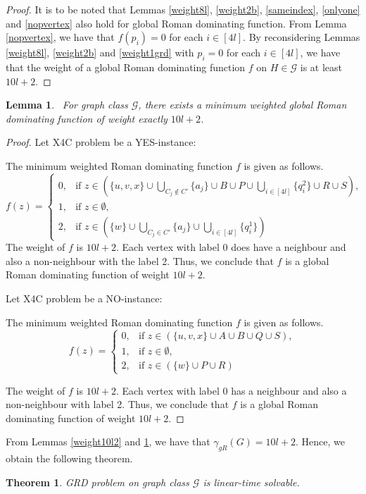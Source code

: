 \documentclass[preprint,12pt]{elsarticle}
\newtheorem{theorem}{Theorem}[section]
\newtheorem{lemma}{Lemma}
\begin{document}
\begin{proof}
    It is to be noted that Lemmas \ref{weight8l}, \ref{weight2b}, \ref{sameindex}, \ref{onlyone} and \ref{nopvertex} also hold for global Roman dominating function. From Lemma \ref{nopvertex}, we have that $f(p_i) = 0$ for each $i \in [4l]$. By reconsidering Lemmas \ref{weight8l}, \ref{weight2b} and \ref{weight1grd} with $p_i = 0$ for each $i \in [4l]$, we have that the weight of a global Roman dominating function $f$ on $H \in \mathcal{G}$ is at least $10l+2$. 
\end{proof}
\begin{lemma}~\label{grd-conclude}
    For graph class $\mathcal{G}$, there exists a minimum weighted global Roman dominating function of weight exactly $10l+2$.
\end{lemma}
\begin{proof}
    Let X4C problem be a YES-instance:

 The minimum weighted Roman dominating function $f$ is given as follows.
\[f(z) = \begin{cases}
0, & \text{if } z \in \left( \{u, v,x\} \cup \bigcup\limits_{C_j \notin C'}\{a_j\} \cup B \cup P \cup \bigcup\limits_{i\in[4l]} \{q_i^2\} \cup R \cup S \right), \\
1, & \text{if } z \in \emptyset, \\
2, & \text{if } z \in \left(\{w\} \cup \bigcup\limits_{C_j \in C'} \{a_j\} \cup \bigcup\limits_{i\in[4l]} \{q_i^1\} \right)
\end{cases}
\]
The weight of $f$ is $10l+2$. Each vertex with label 0 does have a neighbour and also a non-neighbour with the label 2. Thus, we conclude that $f$ is a global Roman dominating function of weight $10l+2$.

\medskip
\noindent 
Let X4C problem be a NO-instance:

 The minimum weighted Roman dominating function $f$ is given as follows.
    \[f(z) = \begin{cases}
0, & \text{if } z \in \left( \{u, v,x\} \cup A \cup B \cup Q \cup S \right), \\
1, & \text{if } z \in \emptyset, \\
2, & \text{if } z \in \left(\{w\} \cup P \cup R \right)
\end{cases}
\]

The weight of $f$ is $10l+2$. Each vertex with label 0 has a neighbour and also a non-neighbour with label 2. Thus, we conclude that $f$ is a global Roman dominating function of weight $10l+2$.
\end{proof}
From Lemmas \ref{weight10l2} and \ref{grd-conclude}, we have that $\gamma_{gR}(G) = 10l+2$. Hence, we obtain the following theorem.
\begin{theorem}
    GRD problem on graph class $\mathcal{G}$ is linear-time solvable.
\end{theorem}
\end{document}
